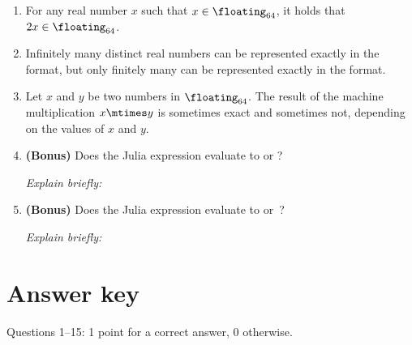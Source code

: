 \documentclass[a4paper]{article}
\begin{document}
\begin{enumerate}
    \item
        For any real number $x$ such that $x \in \floating_{64}$,
        it holds that $2x \in \floating_{64}$.

    \item
        Infinitely many distinct real numbers can be represented exactly in the~
        format, but only finitely many can be represented exactly in the  format.

    \item
        Let $x$ and $y$ be two numbers in $\floating_{64}$.
        The result of the machine multiplication $x \mtimes y$ is sometimes exact and sometimes not,
        depending on the values of $x$ and $y$.

    \item
        \textbf{(Bonus)}
        Does the Julia expression  evaluate to 
        or ?

        \textit{Explain briefly:}
        \vspace{1.5cm}

    \item
        \textbf{(Bonus)}
        Does the Julia expression  evaluate to 
        or~?

        \textit{Explain briefly:}
        \vspace{1.5cm}

\end{enumerate}

\ifdefined\showsolutions
\newpage
{}
\section*{Answer key}
\noindent Questions 1--15: 1 point for a correct answer, 0 otherwise.
\end{document}
